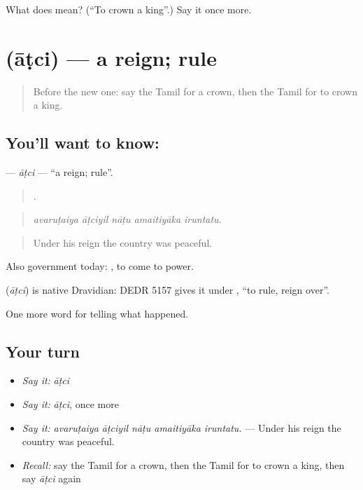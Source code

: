 \begin{tcolorbox}[breakable,colback=teal!4,colframe=teal!35!black,title={Before you move on}]
What does  mean? (\textquotedblleft{}To crown a king\textquotedblright{}.) Say it once more.
\end{tcolorbox}
\section[\texorpdfstring{\ta{ஆட்சி} (āṭci)}{ஆட்சி (āṭci)}]{ (āṭci) — a reign; rule}

\label{lesson:TA-C329-atci}



\begin{quote}
Before the new one: say the Tamil for a crown, then the Tamil for to crown a king.
\end{quote}

\subsection*{You'll want to know: }
\textbf{} — \emph{āṭci} — \textquotedblleft{}a reign; rule\textquotedblright{}.

\begin{quote}
    .
\end{quote}

\begin{quote}
\emph{avaruṭaiya āṭciyil nāṭu amaitiyāka iruntatu.}
\end{quote}

\begin{quote}
Under his reign the country was peaceful.
\end{quote}

Also government today:  , to come to power.

\begin{cousinweb}
\textbf{} (\emph{āṭci}) is native Dravidian: DEDR 5157 gives it under , \textquotedblleft{}to rule, reign over\textquotedblright{}.
\end{cousinweb}

\begin{grammarlens}[title={What you've built}]
One more word for telling what happened.
\end{grammarlens}

\subsection*{Your turn}
\begin{itemize}
\raggedright
  \item \emph{Say it:} \emph{āṭci}
  \item \emph{Say it:} \emph{āṭci}, once more
  \item \emph{Say it:} \emph{avaruṭaiya āṭciyil nāṭu amaitiyāka iruntatu.} — Under his reign the country was peaceful.
  \item \emph{Recall:} say the Tamil for a crown, then the Tamil for to crown a king, then say \emph{āṭci} again
\end{itemize}

